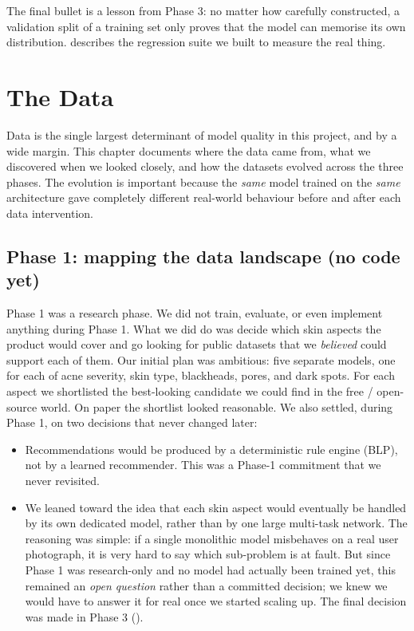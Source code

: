 \documentclass[11pt,a4paper,oneside]{report}
\begin{document}
The final bullet is a lesson from Phase 3: no matter how carefully
constructed, a validation split of a training set only proves that
the model can memorise its own distribution. 
describes the regression suite we built to measure the real thing.

\chapter{The Data}\label{ch:data}

Data is the single largest determinant of model quality in this
project, and by a wide margin. This chapter documents where the data
came from, what we discovered when we looked closely, and how the
datasets evolved across the three phases. The evolution is important
because the \emph{same} model trained on the \emph{same} architecture
gave completely different real-world behaviour before and after each
data intervention.

\section{Phase 1: mapping the data landscape (no code yet)}

Phase 1 was a research phase. We did not train, evaluate, or even
implement anything during Phase 1. What we did do was decide which
skin aspects the product would cover and go looking for public
datasets that we \emph{believed} could support each of them. Our
initial plan was ambitious: five separate models, one for each of
acne severity, skin type, blackheads, pores, and dark spots. For
each aspect we shortlisted the best-looking candidate we could find
in the free / open-source world. On paper the shortlist looked
reasonable. We also settled, during Phase 1, on two decisions that
never changed later:

\begin{itemize}
    \item Recommendations would be produced by a deterministic
        rule engine (BLP), not by a learned recommender. This was
        a Phase-1 commitment that we never revisited.
    \item We leaned toward the idea that each skin aspect would
        eventually be handled by its own dedicated model, rather
        than by one large multi-task network. The reasoning was
        simple: if a single monolithic model misbehaves on a real
        user photograph, it is very hard to say which sub-problem
        is at fault. But since Phase 1 was research-only and no
        model had actually been trained yet, this remained an
        \emph{open question} rather than a committed decision;
        we knew we would have to answer it for real once we
        started scaling up. The final decision was made in
        Phase 3 ().
\end{itemize}
\end{document}
